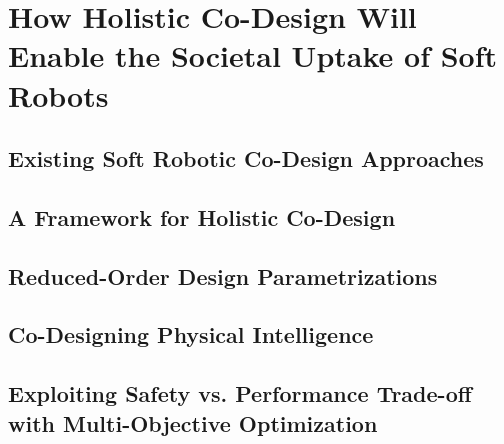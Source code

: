 \chapter{How Holistic Co-Design Will Enable the Societal Uptake of Soft Robots}\label{chp:apx:towardscodesign}
\section{Existing Soft Robotic Co-Design Approaches}
\section{A Framework for Holistic Co-Design}
\section{Reduced-Order Design Parametrizations}
\section{Co-Designing Physical Intelligence}
\section{Exploiting Safety vs. Performance Trade-off with Multi-Objective Optimization}